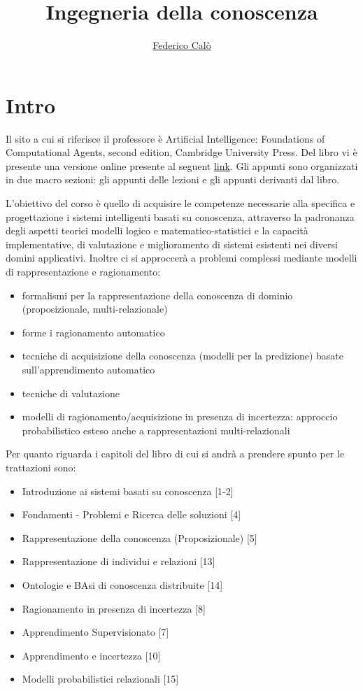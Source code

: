 \documentclass[a4paper]{extarticle}
\title{Ingegneria della conoscenza}
\author{\href{http://www.federicocalo.it}{Federico Calò} }
\date{}
\begin{document}
\maketitle
\newpage
\tableofcontents
\voffset -30pt

\newpage

\section*{Intro}

 Il sito a cui si riferisce il professore è Artificial Intelligence: Foundations of Computational Agents, second edition, Cambridge University Press. Del libro vi è presente una versione online presente al seguent \href{https://artint.info/}{link}. Gli appunti sono organizzati in due macro sezioni: gli appunti delle lezioni e gli appunti derivanti dal libro. 

L'obiettivo del corso è quello di acquisire le competenze necessarie alla specifica e progettazione i sistemi intelligenti basati su conoscenza, attraverso la padronanza degli aspetti teorici modelli logico e matematico-statistici e la capacità implementative, di valutazione e miglioramento di sistemi esistenti nei diversi domini applicativi. Inoltre ci si approccerà a problemi complessi mediante modelli di rappresentazione e ragionamento:
 
 \begin{itemize}
 	\item formalismi per la rappresentazione della conoscenza di dominio (proposizionale, multi-relazionale)
 	\item forme i ragionamento automatico
 	\item tecniche di acquisizione della conoscenza (modelli per la predizione) basate sull'apprendimento automatico
 	\item tecniche di valutazione
 	\item modelli di ragionamento/acquisizione in presenza di incertezza: approccio probabilistico esteso anche a rappresentazioni multi-relazionali
 \end{itemize}
 
Per quanto riguarda i capitoli del libro di cui si andrà a prendere spunto per le trattazioni sono:

\begin{itemize}
	\item Introduzione ai sistemi basati su conoscenza [1-2]
	\item Fondamenti - Problemi e Ricerca delle soluzioni [4]
	\item Rappresentazione della conoscenza (Proposizionale) [5]
	\item Rappresentazione di individui e relazioni [13]
	\item Ontologie e BAsi di conoscenza distribuite [14]
	\item Ragionamento in presenza di incertezza [8]
	\item Apprendimento Supervisionato [7]
	\item Apprendimento e incertezza [10]
	\item Modelli probabilistici relazionali [15]
\end{itemize}
 
\end{document}
